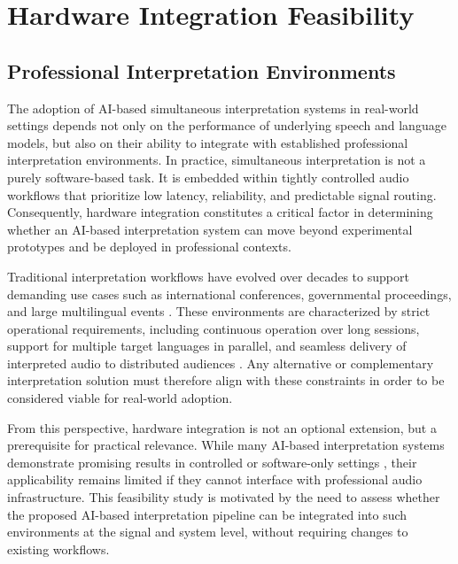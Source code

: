 \chapter{Hardware Integration Feasibility}
\label{chapter:hardware}


\section{Professional Interpretation Environments}
\label{sec:hardware_context}

The adoption of AI-based simultaneous interpretation systems in real-world settings depends not only on the performance of underlying speech and language models, but also on their ability to integrate with established professional interpretation environments. In practice, simultaneous interpretation is not a purely software-based task. It is embedded within tightly controlled audio workflows that prioritize low latency, reliability, and predictable signal routing. Consequently, hardware integration constitutes a critical factor in determining whether an AI-based interpretation system can move beyond experimental prototypes and be deployed in professional contexts.

Traditional interpretation workflows have evolved over decades to support demanding use cases such as international conferences, governmental proceedings, and large multilingual events \cite{conference_interpreting_new_tech}. These environments are characterized by strict operational requirements, including continuous operation over long sessions, support for multiple target languages in parallel, and seamless delivery of interpreted audio to distributed audiences \cite{gencheva2023features}. Any alternative or complementary interpretation solution must therefore align with these constraints in order to be considered viable for real-world adoption.

From this perspective, hardware integration is not an optional extension, but a prerequisite for practical relevance. While many AI-based interpretation systems demonstrate promising results in controlled or software-only settings \cite{he2019streamingarxiv, Aminzadeh2009Advocate, jia2022translatotron2}, their applicability remains limited if they cannot interface with professional audio infrastructure. This feasibility study is motivated by the need to assess whether the proposed AI-based interpretation pipeline can be integrated into such environments at the signal and system level, without requiring changes to existing workflows.

